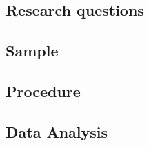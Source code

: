 \documentclass[
  english,
  man]{apa6}
\begin{document}
\hypertarget{research-questions-1}{%
\subsection{Research questions}\label{research-questions-1}}

\hypertarget{sample-1}{%
\subsection{Sample}\label{sample-1}}

\hypertarget{procedure-1}{%
\subsection{Procedure}\label{procedure-1}}

\hypertarget{data-analysis-1}{%
\subsection{Data Analysis}\label{data-analysis-1}}
\end{document}

